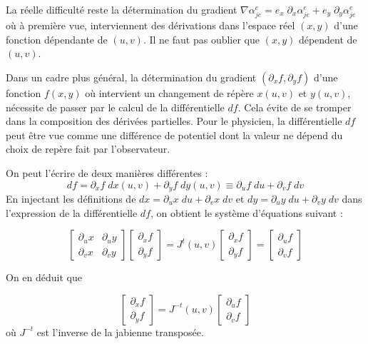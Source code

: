 \documentclass[a4paper, 11pt]{article}
\begin{document}
La réelle difficulté reste la détermination du gradient $\nabla \alpha_{je}^e= e_x\; \partial_x \alpha_{je}^e+ e_y \; \partial_y \alpha_{je}^e$
où à première vue, interviennent des dérivations dans l'espace réel $(x,y)$ d'une fonction dépendante de $(u,v)$.
Il ne faut pas oublier que $(x,y)$ dépendent de $(u,v)$.

Dans un cadre plus général, la détermination du  gradient $(\partial_x f, \partial_y f)$ d'une fonction $f(x,y)$ où intervient un changement de répère $x(u,v)$ et $y(u,v)$,
nécessite de passer par le calcul de la différentielle $df$. Cela évite de se tromper dans la composition des dérivées partielles.
Pour le physicien, la différentielle $df$ peut être vue comme une différence de potentiel dont la valeur ne dépend du choix de repère
fait par l'observateur.

On peut l'écrire de deux manières différentes :
\begin{equation}
df = \partial_x f \; dx(u,v) + \partial_y f \; dy(u,v) \equiv \partial_u f \; du + \partial_v f \; dv
\end{equation}
En injectant les définitions de $dx = \partial_u x \; du + \partial_v x \; dv$ et $dy = \partial_u y \; du + \partial_v y \; dv$ dans 
l'expression de la différentielle $df$, on obtient le système d'équations suivant :

\begin{equation}
\begin{bmatrix}
    \partial_u x & \partial_u y \\
    \partial_v x & \partial_v y
\end{bmatrix}
\begin{bmatrix}
    \partial_x f \\
    \partial_y f
\end{bmatrix}
=
J^t(u,v)
\begin{bmatrix}
    \partial_x f \\
    \partial_y f
\end{bmatrix}
=
\begin{bmatrix}
    \partial_u f \\
    \partial_v f
\end{bmatrix}
\end{equation}

\noindent
On en déduit que 

\begin{equation}
\begin{bmatrix}
    \partial_x f \\
    \partial_y f
\end{bmatrix}
=
J^{-t}(u,v)
\begin{bmatrix}
    \partial_u f \\
    \partial_v f
\end{bmatrix}
\end{equation}
où $J^{-t}$ est l'inverse de la jabienne transposée.
\end{document}
